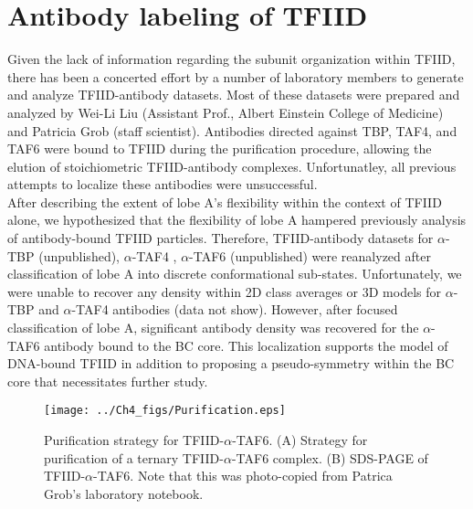 
\chapter{Antibody labeling of TFIID}

Given the lack of information regarding the subunit organization within TFIID, there has been a concerted effort by a number of laboratory members to generate and analyze TFIID-antibody datasets. Most of these datasets were prepared and analyzed by Wei-Li Liu (Assistant Prof., Albert Einstein College of Medicine) and Patricia Grob (staff scientist). Antibodies directed against TBP, TAF4, and TAF6 were bound to TFIID during the purification procedure, allowing the elution of stoichiometric TFIID-antibody complexes. Unfortunatley, all previous attempts to localize these antibodies were unsuccessful. \\
\indent After describing the extent of lobe A's flexibility within the context of TFIID alone, we hypothesized that the flexibility of lobe A hampered previously analysis of antibody-bound TFIID particles. Therefore, TFIID-antibody datasets for $\alpha$-TBP (unpublished), $\alpha$-TAF4 \cite{Liu_723}, $\alpha$-TAF6 (unpublished) were reanalyzed after classification of lobe A into discrete conformational sub-states. Unfortunately, we were unable to recover any density within 2D class averages or 3D models for $\alpha$-TBP and $\alpha$-TAF4 antibodies (data not show).  However, after focused classification of lobe A, significant antibody density was recovered for the $\alpha$-TAF6 antibody bound to the BC core. This localization supports the model of DNA-bound TFIID in addition to proposing a pseudo-symmetry within the BC core that necessitates further study. 
\begin{figure}
\centering
\texttt{[image: ../Ch4\_figs/Purification.eps]}
\caption[Purification strategy for TFIID-$\alpha$-TAF6]{Purification strategy for TFIID-$\alpha$-TAF6. (A) Strategy for purification of a ternary TFIID-$\alpha$-TAF6 complex. (B) SDS-PAGE of TFIID-$\alpha$-TAF6. Note that this was photo-copied from Patrica Grob's laboratory notebook. }
\label{fig:Purify}
\end{figure}

